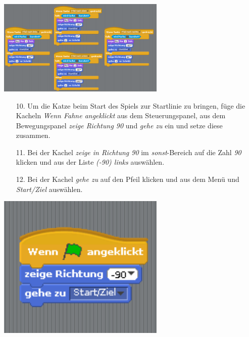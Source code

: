 \includegraphics[width=0.6\textwidth]{images/aufgabe4_katze_alle_richtungen.png}
\begin{itemize}
\item[10. ] Um die Katze beim Start des Spiels zur Startlinie zu bringen, füge die Kacheln \textit{Wenn Fahne angeklickt} aus dem Steuerungspanel, aus dem Bewegungspanel \textit{zeige Richtung 90} und \textit{gehe zu} ein und setze diese zusammen.
\item[11. ] Bei der Kachel \textit{zeige in Richtung 90} im \textit{sonst}-Bereich auf die Zahl \textit{90} klicken und aus der Liste \textit{(-90) links} auswählen.
\item[12. ] Bei der Kachel \textit{gehe zu} auf den Pfeil klicken und aus dem Menü und \textit{Start/Ziel} auswählen.
\end{itemize}
\includegraphics[width=0.6\textwidth]{images/aufgabe4_katze_an_start_stop.png}

